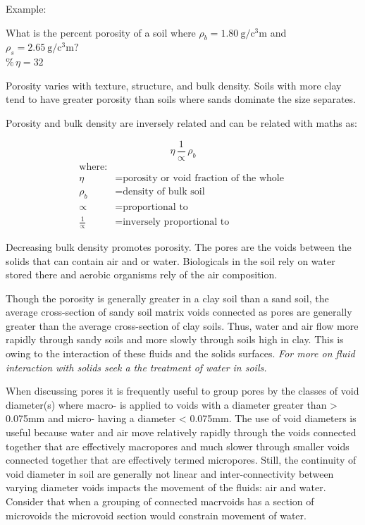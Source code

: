 \documentclass[letterpaper, 12pt]{article}
\begin{document}
Example:

What is the percent porosity of a soil where $\rho_b = \qty[per-mode=fraction]{1.80}{\gram\per\cubic\centi\meter}$ and $\rho_s = \qty[per-mode=fraction]{2.65}{\gram\per\cubic\centi\meter} ?$ \\
$\%\,\eta = 32$

Porosity varies with texture, structure, and bulk density. Soils with more clay tend to have greater porosity than soils where sands dominate the size separates.

Porosity and bulk density are inversely related and can be related with maths as:

\noindent\begin{minipage}{\textwidth}
\begin{equation}
    \eta \, \frac{1}{\propto} \, \rho_b
\end{equation}
\begin{equation*}
    \begin{aligned}
        \text{where:}                                          \\
        \eta &= \text{porosity or void fraction of the whole } \\
        \rho_b &= \text{density of bulk soil}                  \\
        \propto &= \text{proportional to}                      \\
        \frac{1}{\propto} &= \text{inversely proportional to}
    \end{aligned}
\end{equation*}
\end{minipage}

Decreasing bulk density promotes porosity. The pores are the voids between the solids that can contain air and or water. Biologicals in the soil rely on water stored there and aerobic organisms rely of the air composition.

Though the porosity is generally greater in a clay soil than a sand soil, the average cross-section of sandy soil matrix voids connected as pores are generally greater than the average cross-section of clay soils. Thus, water and air flow more rapidly through sandy soils and more slowly through soils high in clay. This is owing to the interaction of these fluids and the solids surfaces. \textit{For more on fluid interaction with solids seek a the treatment of water in soils.}

When discussing pores it is frequently useful to group pores by the classes of void diameter(s) where macro- is applied to voids with a diameter greater than \num{> 0.075}{mm} and micro- having a diameter \num{< 0.075}{mm}. The use of void diameters is useful because water and air move relatively rapidly through the voids connected together that are effectively macropores and much slower through smaller voids connected together that are effectively termed micropores. Still, the continuity of void diameter in soil are generally not linear and inter-connectivity between varying diameter voids impacts the movement of the fluids: air and water. Consider that when a grouping of connected macrvoids has a section of microvoids the microvoid section would constrain movement of water.
\end{document}
